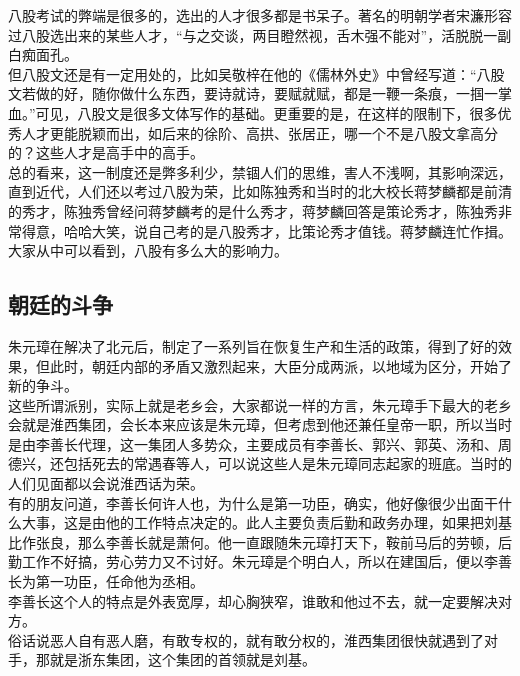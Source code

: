 \begin{multicols}{\theparacolNo}
八股考试的弊端是很多的，选出的人才很多都是书呆子。著名的明朝学者宋濂形容过八股选出来的某些人才，“与之交谈，两目瞪然视，舌木强不能对”，活脱脱一副白痴面孔。\\

但八股文还是有一定用处的，比如吴敬梓在他的《儒林外史》中曾经写道：“八股文若做的好，随你做什么东西，要诗就诗，要赋就赋，都是一鞭一条痕，一掴一掌血。”可见，八股文是很多文体写作的基础。更重要的是，在这样的限制下，很多优秀人才更能脱颖而出，如后来的徐阶、高拱、张居正，哪一个不是八股文拿高分的？这些人才是高手中的高手。\\

总的看来，这一制度还是弊多利少，禁锢人们的思维，害人不浅啊，其影响深远，直到近代，人们还以考过八股为荣，比如陈独秀和当时的北大校长蒋梦麟都是前清的秀才，陈独秀曾经问蒋梦麟考的是什么秀才，蒋梦麟回答是策论秀才，陈独秀非常得意，哈哈大笑，说自己考的是八股秀才，比策论秀才值钱。蒋梦麟连忙作揖。大家从中可以看到，八股有多么大的影响力。\\

\subsection{朝廷的斗争}
朱元璋在解决了北元后，制定了一系列旨在恢复生产和生活的政策，得到了好的效果，但此时，朝廷内部的矛盾又激烈起来，大臣分成两派，以地域为区分，开始了新的争斗。\\

这些所谓派别，实际上就是老乡会，大家都说一样的方言，朱元璋手下最大的老乡会就是淮西集团，会长本来应该是朱元璋，但考虑到他还兼任皇帝一职，所以当时是由李善长代理，这一集团人多势众，主要成员有李善长、郭兴、郭英、汤和、周德兴，还包括死去的常遇春等人，可以说这些人是朱元璋同志起家的班底。当时的人们见面都以会说淮西话为荣。\\

有的朋友问道，李善长何许人也，为什么是第一功臣，确实，他好像很少出面干什么大事，这是由他的工作特点决定的。此人主要负责后勤和政务办理，如果把刘基比作张良，那么李善长就是萧何。他一直跟随朱元璋打天下，鞍前马后的劳顿，后勤工作不好搞，劳心劳力又不讨好。朱元璋是个明白人，所以在建国后，便以李善长为第一功臣，任命他为丞相。\\

李善长这个人的特点是外表宽厚，却心胸狭窄，谁敢和他过不去，就一定要解决对方。\\

俗话说恶人自有恶人磨，有敢专权的，就有敢分权的，淮西集团很快就遇到了对手，那就是浙东集团，这个集团的首领就是刘基。\\


\end{multicols}
